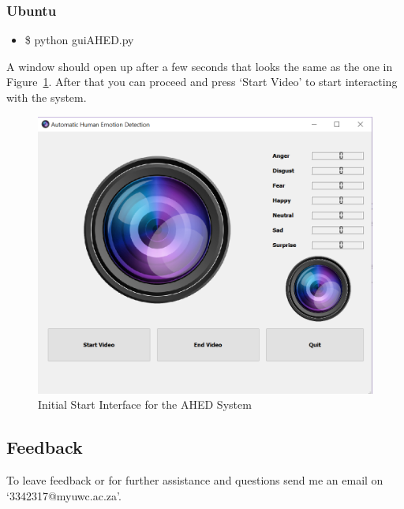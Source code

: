 \subsubsection{Ubuntu}
\begin{itemize}
\item \$ python guiAHED.py 
\end{itemize}
A window should open up after a few seconds that looks the same as the one in Figure~\ref{fig:start}. After that you can proceed and press `Start Video' to start interacting with the system.
\begin{figure}[H]
  \centering
  \includegraphics[scale=0.5]{start}
  \caption{Initial Start Interface for the AHED System}
  \label{fig:start}
\end{figure} 

\subsection{Feedback}
To leave feedback or for further assistance and questions send me an email on `3342317@myuwc.ac.za'.
